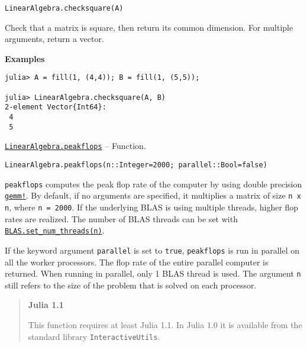 \begin{adjustwidth}{2em}{0pt}


\begin{verbatim}
LinearAlgebra.checksquare(A)
\end{verbatim}

Check that a matrix is square, then return its common dimension. For multiple arguments, return a vector.

\textbf{Examples}


\begin{verbatim}
julia> A = fill(1, (4,4)); B = fill(1, (5,5));

julia> LinearAlgebra.checksquare(A, B)
2-element Vector{Int64}:
 4
 5
\end{verbatim}



\end{adjustwidth}
\hypertarget{2023980161110391079}{}
\hyperlink{2023980161110391079}{\texttt{LinearAlgebra.peakflops}}  -- {Function.}

\begin{adjustwidth}{2em}{0pt}


\begin{verbatim}
LinearAlgebra.peakflops(n::Integer=2000; parallel::Bool=false)
\end{verbatim}

\texttt{peakflops} computes the peak flop rate of the computer by using double precision \hyperlink{8173170876588438683}{\texttt{gemm!}}. By default, if no arguments are specified, it multiplies a matrix of size \texttt{n x n}, where \texttt{n = 2000}. If the underlying BLAS is using multiple threads, higher flop rates are realized. The number of BLAS threads can be set with \hyperlink{2145233402822007277}{\texttt{BLAS.set\_num\_threads(n)}}.

If the keyword argument \texttt{parallel} is set to \texttt{true}, \texttt{peakflops} is run in parallel on all the worker processors. The flop rate of the entire parallel computer is returned. When running in parallel, only 1 BLAS thread is used. The argument \texttt{n} still refers to the size of the problem that is solved on each processor.

\begin{quote}
\textbf{Julia 1.1}

This function requires at least Julia 1.1. In Julia 1.0 it is available from the standard library \texttt{InteractiveUtils}.

\end{quote}


\end{adjustwidth}

